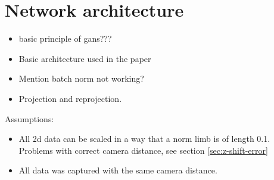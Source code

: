 \section{Network architecture}
\begin{itemize}
	\item basic principle of gans???
	\item Basic architecture used in the paper
	\item Mention batch norm not working?
	\item Projection and reprojection.
\end{itemize}

Assumptions:
\begin{itemize}
	\item All 2d data can be scaled in a way that a norm limb is of length 0.1. 
	Problems with correct camera distance, see section \ref{sec:z-shift-error}
	\item All data was captured with the same camera distance.
\end{itemize}